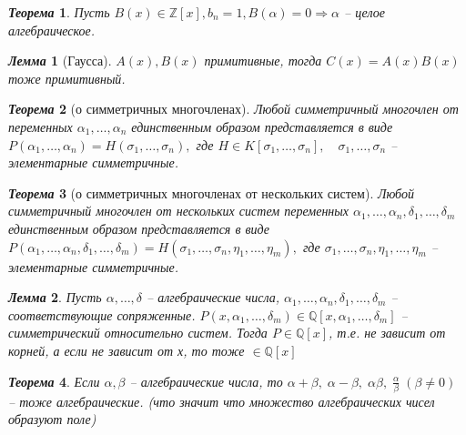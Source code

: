 \documentclass[a4paper,12pt]{article}
\newtheorem{teo2}{\textit{Теорема}}
\newtheorem{lem2}{\textit{Лемма}}
\newcommand{\AL}{\alpha}
\newcommand{\q}{\quad}
\newcommand{\Ra}{\Rightarrow}
\newcommand{\bb}[1]{\mathbb{#1}}
\begin{document}
\begin{formbox}{}
\begin{teo2} Пусть $B(x) \in \bb{Z}[x], b_n = 1, B(\AL) = 0 \Ra \AL$ -- целое алгебраическое.
\end{teo2}
\end{formbox}
\begin{formbox}{}
\begin{lem2}[Гаусса] $A(x),B(x)$ примитивные, тогда $C(x) = A(x)B(x)$ тоже примитивный.
\end{lem2}
\end{formbox}
\begin{formbox}{}
\begin{teo2} [о симметричных многочленах] Любой симметричный многочлен от переменных $\AL_1, \dots, \AL_n$  единственным образом представляется в виде $P(\AL_1,\dots,\AL_n) = H(\sigma_1, \dots, \sigma_n),$ где $H\in K[\sigma_1, \dots, \sigma_n], \q \sigma_1, \dots, \sigma_n$ -- элементарные симметричные.
\end{teo2}
\end{formbox}
\begin{formbox}{}

\begin{teo2} [о симметричных многочленах от нескольких систем] Любой симметричный многочлен от нескольких систем переменных $\AL_1, \dots, \AL_n, \delta_1,\dots,\delta_m$  единственным образом представляется в виде $P(\AL_1,\dots,\AL_n,\delta_1,\dots,\delta_m) = H(\sigma_1, \dots, \sigma_n, \eta_1,\dots, \eta_m),$ где $\sigma_1, \dots, \sigma_n, \eta_1,\dots, \eta_m$ -- элементарные симметричные.
\end{teo2}
\end{formbox}
\begin{formbox}{}
\begin{lem2} Пусть $\AL,\dots,\delta$ -- алгебраические числа, $\AL_1,\dots,\AL_n,\delta_1,\dots,\delta_m$ -- соответствующие сопряженные. $P(x,\AL_1,\dots, \delta_m)\in\bb{Q}[x,\AL_1,\dots, \delta_m]$ -- симметрический относительно систем. Тогда $P\in\bb{Q}[x]$, т.е. не зависит от корней, а если не зависит от х, то тоже  $\in\bb{Q}[x]$%
\end{lem2}
\end{formbox}
\begin{formbox}{}
\begin{teo2}
Если $\AL, \beta$ -- алгебраические числа, то $\AL+\beta, \; \AL-\beta,\; \AL\beta, \; \frac{\AL}{\beta}\; (\beta \not=0)$ -- тоже алгебраические. (что значит что множество алгебраических чисел образуют поле)
\end{teo2}
\end{formbox}
\end{document}
